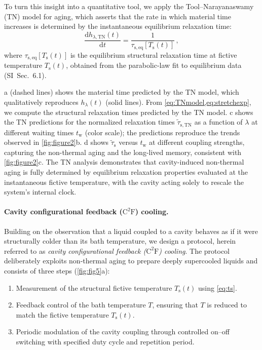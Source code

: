 \documentclass[aps, prl,
 reprint,
 superscriptaddress,
 citeautoscript,
 amsmath,amssymb,
 tightenlines
]{revtex4-2}
\begin{document}
To turn this insight into a quantitative tool, we apply the Tool--Narayanaswamy (TN) model for aging,\cite{Tool1946,Narayanaswamy1971} which asserts that the rate in which material time increases is determined by the instantaneous equilibrium relaxation time:
\begin{equation}
    \frac{\mathrm{d} h_{\lambda,\mathrm{TN}}(t)}{\mathrm{d} t}  = \frac{1}{\tau_\mathrm{s,\mathrm{eq}}[T_\mathrm{s}(t)]} \,, \label{eq:TNmodel}
\end{equation}
where $\tau_\mathrm{s,\mathrm{eq}}[T_\mathrm{s}(t)]$ is the equilibrium structural relaxation time at fictive temperature $T_\mathrm{s}(t)$, obtained from the parabolic-law fit to equilibrium data (SI~Sec.~6.1).





a (dashed lines) shows the material time predicted by the TN model, which qualitatively reproduces $h_\lambda(t)$ (solid lines). From \cref{eq:TNmodel,eq:stretchexp}, we compute the structural relaxation times predicted by the TN model. c shows the TN predictions for the normalized relaxation times $\tilde{\tau}_{\mathrm{s,TN}}$ as a function of $\lambda$ at different waiting times $t_\mathrm{w}$ (color scale); the predictions reproduce the trends observed in \cref{fig:figure2}b. d shows $\tilde{\tau}_\mathrm{s}$ versus $t_\mathrm{w}$ at different coupling strengths, capturing the non-thermal aging and the long-lived memory, consistent with \cref{fig:figure2}c. The TN analysis demonstrates that cavity-induced non-thermal aging is fully determined by equilibrium relaxation properties evaluated at the instantaneous fictive temperature, with the cavity acting solely to rescale the system's internal clock. 


\paragraph*{Cavity configurational feedback ($\mathrm{C^2 F}$) cooling.} 

Building on the observation that a liquid coupled to a cavity behaves as if it were structurally colder than its bath temperature, we design a protocol, herein referred to as \textit{cavity configurational feedback ($\mathrm{C^2F}$) cooling}. 
The protocol deliberately exploits non-thermal aging to prepare deeply supercooled liquids and consists of three steps (\cref{fig:fig5}a):

\begin{enumerate}
    \item Measurement of the structural fictive temperature $T_\mathrm{s}(t)$ using \cref{eq:ts}.
    \item Feedback control of the bath temperature $T$, ensuring that $T$ is reduced to match the fictive temperature $T_\mathrm{s}(t)$.  
    \item Periodic modulation of the cavity coupling through controlled on–off switching with specified duty cycle and repetition period.
\end{enumerate}
\end{document}

